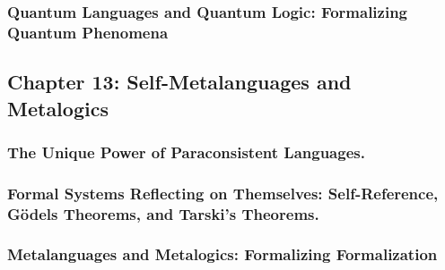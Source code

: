 \hypertarget{quantum-languages-and-quantum-logic-formalizing-quantum-phenomena}{%
\subsubsection*{Quantum Languages and Quantum Logic: Formalizing Quantum
Phenomena}\label{quantum-languages-and-quantum-logic-formalizing-quantum-phenomena}}

\hypertarget{chapter-13-self-metalanguages-and-metalogics}{%
\subsection*{Chapter 13: Self-Metalanguages and
Metalogics}\label{chapter-13-self-metalanguages-and-metalogics}}

\hypertarget{the-unique-power-of-paraconsistent-languages.}{%
\subsubsection*{The Unique Power of Paraconsistent
Languages.}\label{the-unique-power-of-paraconsistent-languages.}}

\hypertarget{formal-systems-reflecting-on-themselves-self-reference-guxf6dels-theorems-and-tarskis-theorems.}{%
\subsubsection*{Formal Systems Reflecting on Themselves: Self-Reference,
Gödel\textquotesingle s Theorems, and Tarski's
Theorems.}\label{formal-systems-reflecting-on-themselves-self-reference-guxf6dels-theorems-and-tarskis-theorems.}}

\hypertarget{metalanguages-and-metalogics-formalizing-formalization}{%
\subsubsection*{Metalanguages and Metalogics: Formalizing
Formalization}\label{metalanguages-and-metalogics-formalizing-formalization}}

